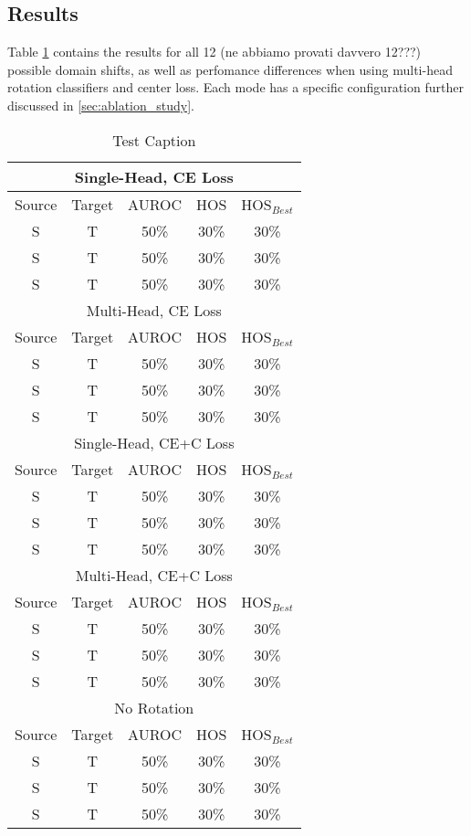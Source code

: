 \documentclass[10pt,twocolumn,letterpaper]{article}
\begin{document}
\subsection{Results}
\label{sec:results}
Table \ref{tab:results} contains the results for all 12 (ne abbiamo provati davvero 12???) possible domain shifts, as well as perfomance differences when using multi-head rotation classifiers and center loss.
Each mode has a specific configuration further discussed in \ref{sec:ablation_study}.

\begin{table}
  \centering
  \begin{tabular}[t]{||c|c|c||c|c||}
    \hline
    \multicolumn{5}{||c||}{Single-Head, CE Loss} \\
    \hline
    Source & Target & AUROC & HOS & HOS$_{Best}$ \\
    S & T & 50\% & 30\% & 30\% \\
    S & T & 50\% & 30\% & 30\% \\
    S & T & 50\% & 30\% & 30\% \\
    \hline
    \hline
    \multicolumn{5}{||c||}{Multi-Head, CE Loss} \\
    \hline
    Source & Target & AUROC & HOS & HOS$_{Best}$ \\
    S & T & 50\% & 30\% & 30\% \\
    S & T & 50\% & 30\% & 30\% \\
    S & T & 50\% & 30\% & 30\% \\
    \hline
    \hline
    \multicolumn{5}{||c||}{Single-Head, CE+C Loss} \\
    \hline
    Source & Target & AUROC & HOS & HOS$_{Best}$ \\
    S & T & 50\% & 30\% & 30\% \\
    S & T & 50\% & 30\% & 30\% \\
    S & T & 50\% & 30\% & 30\% \\
    \hline
    \hline
    \multicolumn{5}{||c||}{Multi-Head, CE+C Loss} \\
    \hline
    Source & Target & AUROC & HOS & HOS$_{Best}$ \\
    S & T & 50\% & 30\% & 30\% \\
    S & T & 50\% & 30\% & 30\% \\
    S & T & 50\% & 30\% & 30\% \\
    \hline 
    \hline
    \multicolumn{5}{||c||}{No Rotation} \\
    \hline
    Source & Target & AUROC & HOS & HOS$_{Best}$ \\
    S & T & 50\% & 30\% & 30\% \\
    S & T & 50\% & 30\% & 30\% \\
    S & T & 50\% & 30\% & 30\% \\
    \hline
  \end{tabular}
  \caption{\label{tab:results}Test Caption}
\end{table}
\end{document}
